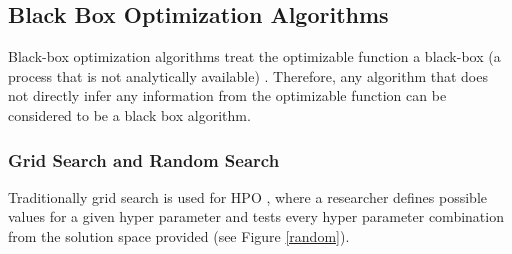 \documentclass[runningheads]{llncs}
\begin{document}
\subsection{Black Box Optimization Algorithms}

Black-box optimization algorithms treat the optimizable function a black-box (a process that is not analytically available) \cite[ch.~1]{book}. Therefore, any algorithm that does not directly infer any information from the optimizable function can be considered to be a black box algorithm.

\subsubsection{Grid Search and Random Search}

Traditionally grid search is used for HPO \cite{liashchynskyi2019grid}, where a researcher defines possible values for a given hyper parameter and tests every hyper parameter combination from the solution space provided (see Figure \ref{random}).
\end{document}
